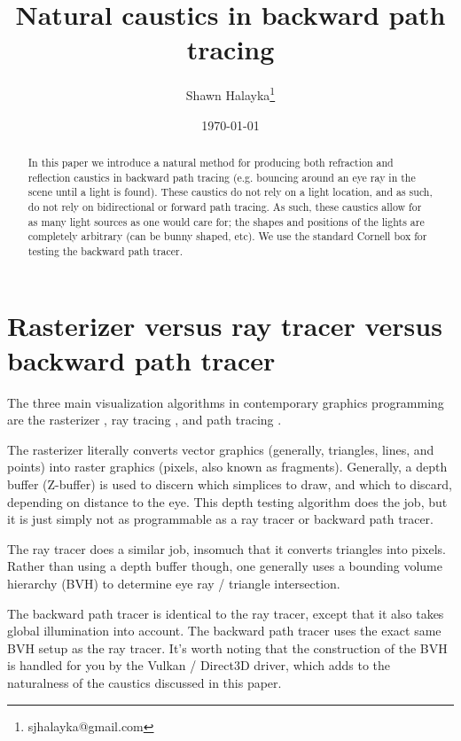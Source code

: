 \documentclass[10pt]{article}
\title{Natural caustics in backward path tracing}
\author{
Shawn Halayka\footnote{sjhalayka@gmail.com}
}
\date{\today\;\currenttime}
\begin{document}
\newcommand{\abs}[1]{\lvert#1\rvert}



\maketitle




\begin{abstract}
In this paper we introduce a natural method for producing both refraction and reflection caustics in backward path tracing (e.g. bouncing around an eye ray in the scene until a light is found).
These caustics do not rely on a light location, and as such, do not rely on bidirectional or forward path tracing.
As such, these caustics allow for as many light sources as one would care for; the shapes and positions of the lights are completely arbitrary (can be bunny shaped, etc).
We use the standard Cornell box for testing the backward path tracer.
\end{abstract}







\section{Rasterizer versus ray tracer versus backward path tracer}

The three main visualization algorithms in contemporary graphics programming are the rasterizer \cite{noll, wikipedia1}, ray tracing \cite{appel, wikipedia2}, and path tracing \cite{kajiya, wikipedia3}.

The rasterizer  literally converts vector graphics (generally, triangles, lines, and points) into raster graphics (pixels, also known as fragments).
Generally, a depth buffer (Z-buffer) \cite{wikipedia4} is used to discern which simplices to draw, and which to discard, depending on distance to the eye.
This depth testing algorithm does the job, but it is just simply not as programmable as a ray tracer or backward path tracer.

The ray tracer does a similar job, insomuch that it converts triangles into pixels.
Rather than using a depth buffer though, one generally uses a bounding volume hierarchy (BVH) \cite{wikipedia5} to determine eye ray / triangle intersection.

The backward path tracer  is identical to the ray tracer, except that it also takes global illumination into account.
The backward path tracer uses the exact same BVH setup as the ray tracer.
It's worth noting that the construction of the BVH is handled for you by the Vulkan / Direct3D driver, which adds to the naturalness of the caustics discussed in this paper.
\end{document}
